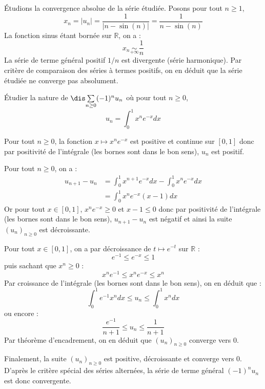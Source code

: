 \documentclass[a4paper,10pt]{report}
\newcommand{\Sum}[2]{\ensuremath{\textstyle{\sum\limits_{#1}^{#2}}}}
\begin{document}
\medskip

\noindent Étudions la convergence absolue de la série étudiée. Posons pour tout $n \geq 1$,
$$ x_n = \vert u_n \vert = \dfrac{1}{\vert n - \sin(n) \vert} = \dfrac{1}{n- \sin(n)}$$
La fonction sinus étant bornée sur $\mathbb{R}$, on a :
$$ x_n \underset{+ \infty}{\sim} \dfrac{1}{n}$$
La série de terme général positif $1/n$ est divergente (série harmonique). Par critère de comparaison des séries à termes positifs, on en déduit que la série étudiée ne converge pas absolument.

\medskip

\begin{Exercice}{} Étudier la nature de $\dis \Sum{n \geq 0}{} (-1)^n u_n$ où pour tout $n \geq 0$,
\vspace{-0.4cm}
$$ u_n = \int_{0}^1 x^n e^{-x} dx$$
\end{Exercice}

\corr Pour tout $n \geq 0$, la fonction $x \mapsto x^n e^{-x}$ est positive et continue sur $[0,1]$ donc par positivité de l'intégrale (les bornes sont dans le bon sens), $u_n$ est positif.

\medskip

\noindent Pour tout $n \geq 0$, on a :
\begin{align*}
u_{n+1}-u_n & = \int_{0}^1 x^{n+1} e^{-x} dx - \int_{0}^1 x^{n} e^{-x} dx \\
& =\int_{0}^1 x^n e^{-x} (x-1) dx
\end{align*}
Or pour tout $x \in [0,1]$, $x^n e^{-x} \geq 0$ et $x-1 \leq 0$ donc par positivité de l'intégrale (les bornes sont dans le bon sens), $u_{n+1}-u_n$ est négatif et ainsi la suite $(u_n)_{n \geq 0}$ est décroissante.

\medskip

\noindent Pour tout $x \in [0,1]$, on a par décroissance de $t \mapsto e^{-t}$ sur $\mathbb{R}$ :
$$e^{-1} \leq e^{-x} \leq 1$$
puis sachant que $x^n \geq 0$ :
$$ x^n e^{-1} \leq x^n e^{-x} \leq x^n $$
Par croissance de l'intégrale (les bornes sont dans le bon sens), on en déduit que :
$$ \int_{0}^1 e^{-1}x^n dx \leq u_n \leq \int_{0}^1 x^n dx$$
ou encore :
$$ \frac{e^{-1}}{n+1} \leq u_n \leq \frac{1}{n+1}$$
Par théorème d'encadrement, on en déduit que $(u_n)_{n \geq 0}$ converge vers $0$.

\medskip

\noindent Finalement, la suite $(u_n)_{n \geq 0}$ est positive, décroissante et converge vers $0$. D'après le critère spécial des séries alternées, la série de terme général $(-1)^n u_n$ est donc convergente. 
\end{document}
